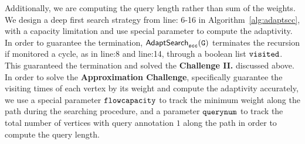 Additionally, we are computing the query length rather than sum of the weights.
We design a deep first search strategy
from line: 6-16 in Algorithm~\ref{alg:adaptscc}, 
with a capacity limitation and use special parameter to compute the adaptivity.
%
\\
In order to
guarantee the termination, 
$\mathtt{\mathsf{AdaptSearch}_{scc}(G)}$
terminates the recursion if monitored a cycle, as in line:8 and line:14, through a boolean list $\mathtt{visited}$.
This guaranteed the termination and solved the \textbf{Challenge II.} discussed above.
\\
In order to
solve the \textbf{Approximation Challenge},
specifically guarantee the visiting times of each vertex by its weight
and compute the adaptivity accurately, 
we use a special parameter $\mathtt{flowcapacity}$  to track the minimum weight
along the path during the 
searching procedure, 
and a parameter $\mathtt{querynum}$
to track the total number of vertices with query annotation $1$
along the path 
in order to compute the query length.
% 


